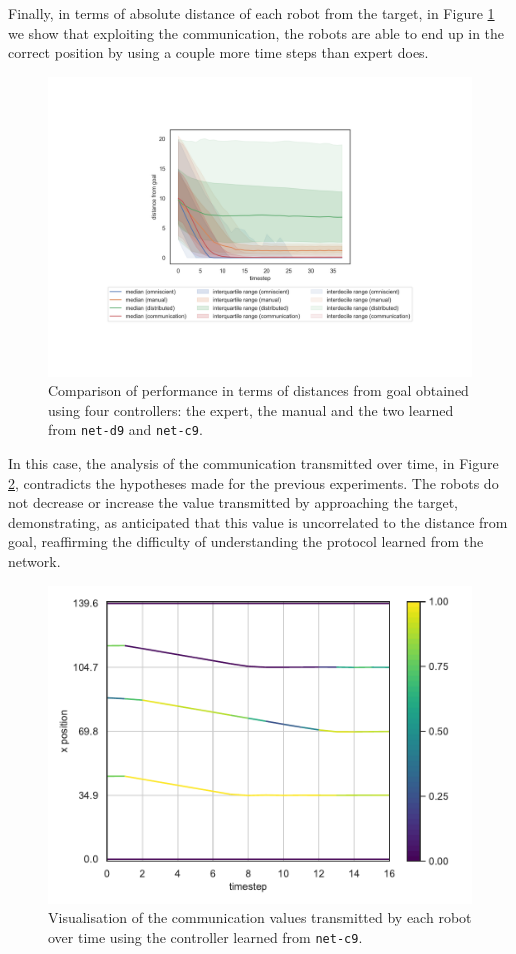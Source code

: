 \bigskip
Finally, in terms of absolute distance of each robot from the target, in Figure 
\ref{fig:net-c9distance} we show that exploiting the communication, the robots 
are able to end up in the correct position by using a couple more time steps than 
expert does. 
\begin{figure}[!htb]
	\centering
	\includegraphics[width=.7\textwidth]{contents/images/net-c9/distances-from-goal-compressed-communication}%
	\caption[Evaluation of \texttt{net-c9} distances from goal.]{Comparison of 
		performance in terms of distances from goal obtained using four controllers: 
		the expert, the manual and the two learned from \texttt{net-d9} and 
		\texttt{net-c9}.}
	\label{fig:net-c9distance}
\end{figure}

In this case, the analysis of the communication transmitted over time, in Figure 
\ref{fig:net-c9comm}, contradicts the hypotheses made for the previous 
experiments. The robots do not decrease or increase the value transmitted by 
approaching the target, demonstrating, as anticipated that this value is 
uncorrelated to the distance from goal, reaffirming the difficulty of understanding 
the protocol learned from the network.
\begin{figure}[!htb]
	\centering
	\includegraphics[width=.6\textwidth]{contents/images/net-c9/1/plot-simulation-communication-1}
	\vspace{-0.5cm}
	\caption[Evaluation of the communication learned by 
	\texttt{net-c9}.]{Visualisation of the communication values transmitted by each 
		robot over time using the controller learned from \texttt{net-c9}.}	
	\label{fig:net-c9comm}
\end{figure}

